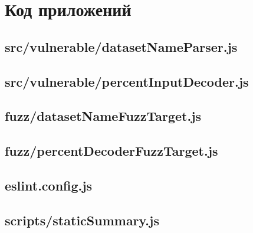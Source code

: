 \chapter{Код приложений}\label{appendix-app-code}

\section*{src/vulnerable/datasetNameParser.js}


\section*{src/vulnerable/percentInputDecoder.js}


\section*{fuzz/datasetNameFuzzTarget.js}


\section*{fuzz/percentDecoderFuzzTarget.js}


\section*{eslint.config.js}


\section*{scripts/staticSummary.js}

